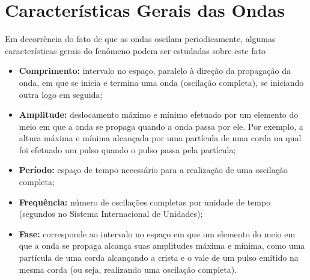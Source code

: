 	\section{Características Gerais das Ondas}
		Em decorrência do fato de que as ondas oscilam periodicamente, algumas características gerais do fenômeno podem ser estudadas sobre este fato \cite{halliday}
		\begin{itemize}
			\item\textbf{Comprimento: }intervalo no espaço, paralelo à direção da propagação da onda, em que se inicia e termina uma onda (oscilação completa), se iniciando outra logo em seguida; 
			
			\item\textbf{Amplitude: }deslocamento máximo e mínimo efetuado por um elemento do meio em que a onda se propaga quando a onda passa por ele. Por exemplo, a altura máxima e mínima alcançada por uma partícula de uma corda na qual foi efetuado um pulso quando o pulso passa pela partícula; 
			
			\item\textbf{Período: }espaço de tempo necessário para a realização de uma oscilação completa; 
			
			\item\textbf{Frequência: }número de oscilações completas por unidade de tempo (segundos no Sistema Internacional de Unidades); 
			\item\textbf{Fase: }corresponde ao intervalo no espaço em que um elemento do meio em que a onda se propaga alcança suas amplitudes máxima e mínima, como uma partícula de uma corda alcançando a crista e o vale de um pulso emitido na mesma corda (ou seja, realizando uma oscilação completa).
		\end{itemize}
	
